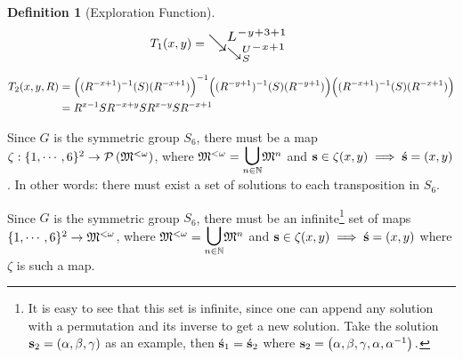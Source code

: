 \documentclass[a4paper,twoside,12pt,openany]{report}
\theoremstyle{plain}
\theoremstyle{definition}
\newtheorem{definition}{Definition}
\theoremstyle{remark}
\begin{document}
\begin{definition}[Exploration Function]
\begin{align*}
T_1(x,y)
	&= {   \conjh {L^{-y+3+1}} {\conjl {U^{-x+1}} S}   }
\end{align*}

\begin{align*}
T_2(x,y,R)
	&= \Bigl((R^{-x+1})^{-1}(S)(R^{-x+1})\Bigl)^{-1}\Bigl((R^{-y+1})^{-1}(S)(R^{-y+1})\Bigl)\Bigl((R^{-x+1})^{-1}(S)(R^{-x+1})\Bigl) \\
	&= R^{x-1}SR^{-x+y}SR^{x-y}SR^{-x+1}
\end{align*}

\newpage

Since \(G\) is the symmetric group \(S_6\), there must be a map
\(\zeta:\{1,\cdots,6\}^2\to \mathcal{P}\left(\mathfrak{M}^{<\omega}\right)\), where \(\mvs^{<\omega}=\underset{n\in\mathbb{N}}{\bbigcup}\mvs^n\) and \(\mathbf{s}\in\zeta(x,y) \implies \acute{\mathbf{s}}=(x,y)\). In other words: there must exist a set of solutions to each transposition in \(S_6\).

Since \(G\) is the symmetric group \(S_6\), there must be an infinite\footnote{It is easy to see that this set is infinite, since one can append any solution with a permutation and its inverse to get a new solution. Take the solution \(\mathbf{s}_2=\left(\alpha,\beta,\gamma\right)\) as an example, then \(\acute{\mathbf{s}}_1=\acute{\mathbf{s}}_2\) where \(\mathbf{s}_2=\left(\alpha,\beta,\gamma,\alpha,\alpha^{-1}\right).\)} set of maps 
\(\{1,\cdots,6\}^2\to \mathfrak{M}^{<\omega}\), 
where \(\mvs^{<\omega}=\underset{n\in\mathbb{N}}{\bbigcup}\mvs^n\) and \(\mathbf{s}\in\zeta(x,y) \implies \acute{\mathbf{s}}=(x,y)\) where \(\zeta\) is such a map.


\end{definition}
\end{document}
